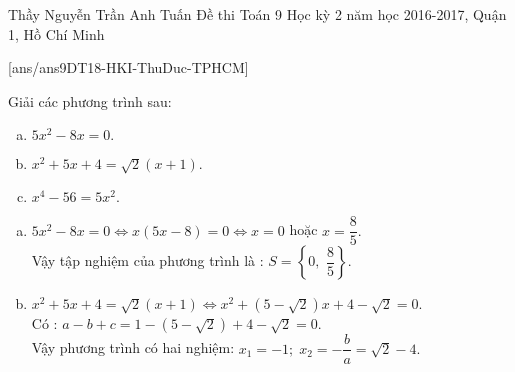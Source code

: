	\begin{name}
		{Thầy Nguyễn Trần Anh Tuấn}
		{Đề thi Toán 9 Học kỳ 2 năm học 2016-2017, Quận 1, Hồ Chí Minh }
	\end{name}
	\setcounter{ex}{0}
	[ans/ans9DT18-HKI-ThuDuc-TPHCM]
	\begin{ex}%
		Giải các phương trình sau:
		\begin{multicols}{2}
			\begin{enumerate}[a)]
				\item $5x^2-8x=0.$\vfill
				\item $x^2+5x+4=\sqrt{2}(x+1).$
				\item $x^4-56=5x^2.$
			\end{enumerate}
		\end{multicols}
		\loigiai
		{
			\begin{enumerate}[a)]
				\item $5x^2-8x=0 \Leftrightarrow x(5x-8)=0 \Leftrightarrow x=0$ hoặc $x = \dfrac{8}{5}.$\\
				Vậy tập nghiệm của phương trình là : $S =\left\{ {0,\,\,\dfrac{8}{5}} \right\}.$
				\item $x^2+5x+4=\sqrt{2}(x+1) \Leftrightarrow  x^2+(5-\sqrt{2})x+4-\sqrt{2}=0$.\\
				Có : $a-b+c=1-(5-\sqrt{2})+4-\sqrt{2}=0.$\\
				Vậy phương trình có hai nghiệm: $x_1=-1; \;x_2=-\dfrac{b}{a}=\sqrt{2}-4.$
									 
			\end{enumerate}
		}
	\end{ex}
	
